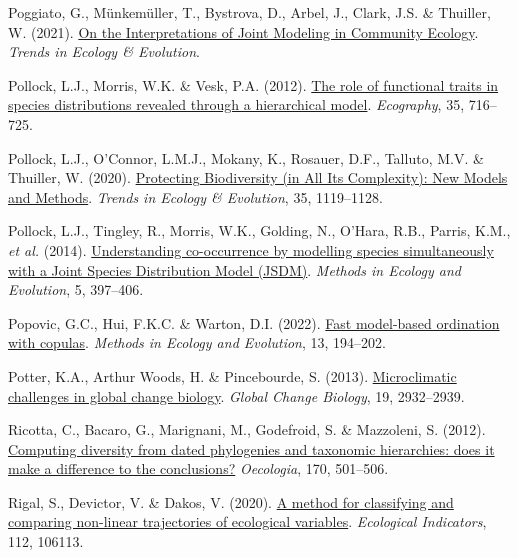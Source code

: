 \documentclass[9pt,biorxiv,doublespacing,lineno,endfloat]{lapreprint}
\newlength{\cslhangindent}
\newlength{\cslentryspacingunit} %
\newenvironment{CSLReferences}[2] %
 {%
  \setlength{\parindent}{0pt}
  \ifodd #1
  \let\oldpar\par
  \def\par{\hangindent=\cslhangindent\oldpar}
  \fi
  \setlength{\parskip}{#2\cslentryspacingunit}
 }%
 {}
\begin{document}
\begin{CSLReferences}{1}{0}
\leavevmode{}%
Poggiato, G., Münkemüller, T., Bystrova, D., Arbel, J., Clark, J.S. \&
Thuiller, W. (2021).
\href{https://doi.org/10.1016/j.tree.2021.01.002}{On the Interpretations
of Joint Modeling in Community Ecology}. \emph{Trends in Ecology \&
Evolution}.

\leavevmode{}%
Pollock, L.J., Morris, W.K. \& Vesk, P.A. (2012).
\href{https://doi.org/10.1111/j.1600-0587.2011.07085.x}{The role of
functional traits in species distributions revealed through a
hierarchical model}. \emph{Ecography}, 35, 716--725.

\leavevmode{}%
Pollock, L.J., O'Connor, L.M.J., Mokany, K., Rosauer, D.F., Talluto,
M.V. \& Thuiller, W. (2020).
\href{https://doi.org/10.1016/j.tree.2020.08.015}{Protecting
Biodiversity (in All Its Complexity): New Models and Methods}.
\emph{Trends in Ecology \& Evolution}, 35, 1119--1128.

\leavevmode{}%
Pollock, L.J., Tingley, R., Morris, W.K., Golding, N., O'Hara, R.B.,
Parris, K.M., \emph{et al.} (2014).
\href{https://doi.org/10.1111/2041-210X.12180}{Understanding
co-occurrence by modelling species simultaneously with a Joint Species
Distribution Model (JSDM)}. \emph{Methods in Ecology and Evolution}, 5,
397--406.

\leavevmode{}%
Popovic, G.C., Hui, F.K.C. \& Warton, D.I. (2022).
\href{https://doi.org/10.1111/2041-210X.13733}{Fast model-based
ordination with copulas}. \emph{Methods in Ecology and Evolution}, 13,
194--202.

\leavevmode{}%
Potter, K.A., Arthur Woods, H. \& Pincebourde, S. (2013).
\href{https://doi.org/10.1111/gcb.12257}{Microclimatic challenges in
global change biology}. \emph{Global Change Biology}, 19, 2932--2939.

\leavevmode{}%
Ricotta, C., Bacaro, G., Marignani, M., Godefroid, S. \& Mazzoleni, S.
(2012). \href{https://doi.org/10.1007/s00442-012-2318-8}{Computing
diversity from dated phylogenies and taxonomic hierarchies: does it make
a difference to the conclusions?} \emph{Oecologia}, 170, 501--506.

\leavevmode{}%
Rigal, S., Devictor, V. \& Dakos, V. (2020).
\href{https://doi.org/10.1016/j.ecolind.2020.106113}{A method for
classifying and comparing non-linear trajectories of ecological
variables}. \emph{Ecological Indicators}, 112, 106113.


\end{CSLReferences}
\end{document}
